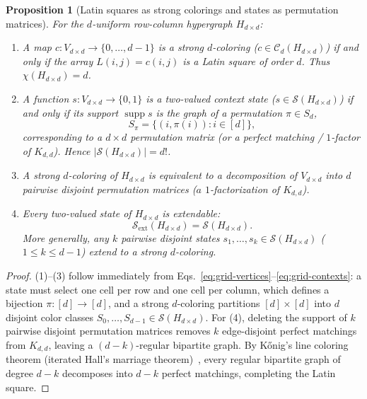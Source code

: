 \documentclass[aps,pra,reprint,superscriptaddress,longbibliography,nofootinbib,floatfix,10pt]{revtex4-2}
\newtheorem{proposition}[theorem]{Proposition}
\theoremstyle{definition}\newtheorem{definition}[theorem]{Definition}
\theoremstyle{remark}\newtheorem{remark}[theorem]{Remark}
\newcommand{\Sc}{\mathcal S}\newcommand{\Cc}{\mathcal C}
\DeclareMathOperator{\supp}{supp}\DeclareMathOperator{\conv}{conv}
\begin{document}
\begin{proposition}[Latin squares as strong colorings and states as permutation matrices]\label{prop:latin-bridge}
For the $d$-uniform row-column hypergraph $H_{d\times d}$:
\begin{enumerate}
\item A map $c:V_{d\times d}\to\{0,\ldots,d-1\}$ is a strong $d$-coloring ($c\in\Cc_d(H_{d\times d})$) if and only if the array $L(i,j)=c(i,j)$ is a Latin square of order $d$. Thus $\chi(H_{d\times d})=d$.
\item A function $s:V_{d\times d}\to\{0,1\}$ is a two-valued context state ($s\in\Sc(H_{d\times d})$) if and only if its support $\supp s$ is the graph of a permutation $\pi\in S_d$,
\begin{equation}\label{eq:perm-state}
S_\pi=\{(i,\pi(i)):i\in[d]\},
\end{equation}
corresponding to a $d\times d$ permutation matrix (or a perfect matching / $1$-factor of $K_{d,d}$). Hence $|\Sc(H_{d\times d})|=d!$.
\item A strong $d$-coloring of $H_{d\times d}$ is equivalent to a decomposition of $V_{d\times d}$ into $d$ pairwise disjoint permutation matrices ($a$ $1$-factorization of $K_{d,d}$).
\item Every two-valued state of $H_{d\times d}$ is extendable:
\begin{equation}\label{eq:latin-all-extend}
\Sc_{\mathrm{ext}}(H_{d\times d})=\Sc(H_{d\times d}).
\end{equation}
More generally, any $k$ pairwise disjoint states $s_1,\ldots,s_k\in\Sc(H_{d\times d})$ ($1\le k\le d-1$) extend to a strong $d$-coloring.
\end{enumerate}
\end{proposition}
\begin{proof}
(1)--(3) follow immediately from Eqs.~\eqref{eq:grid-vertices}--\eqref{eq:grid-contexts}: a state must select one cell per row and one cell per column, which defines a bijection $\pi:[d]\to[d]$, and a strong $d$-coloring partitions $[d]\times[d]$ into $d$ disjoint color classes $S_0,\ldots,S_{d-1}\in\Sc(H_{d\times d})$. For (4), deleting the support of $k$ pairwise disjoint permutation matrices removes $k$ edge-disjoint perfect matchings from $K_{d,d}$, leaving a $(d-k)$-regular bipartite graph. By K\H{o}nig's line coloring theorem (iterated Hall's marriage theorem)~\cite{hall1935representatives}, every regular bipartite graph of degree $d-k$ decomposes into $d-k$ perfect matchings, completing the Latin square.
\end{proof}
\end{document}
